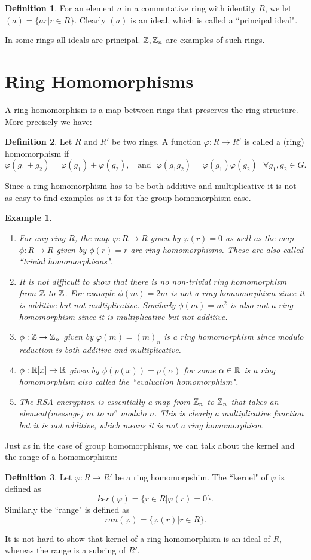 \documentclass[12pt]{article}
\theoremstyle{plain}
\newtheorem{example}{Example}
\theoremstyle{definition}
\newtheorem{definition}{Definition}
\theoremstyle{remark}
\begin{document}
\begin{definition}
For an element $a$ in a commutative ring with identity $R$, we let
$(a) = \{ar|r\in R\}$. Clearly $(a)$ is an ideal, which is called a ``principal ideal".
\end{definition}
In some rings all ideals are principal. $\mathbb{Z}, \mathbb{Z}_n$ are examples of such rings.
\section{Ring Homomorphisms}
A ring homomorphism is a map between rings that preserves the ring structure. More precisely we have:
\begin{definition}
Let $R$ and $R'$ be two rings. A function $\varphi:R\rightarrow R'$ is called a (ring) homomorphism if
$$\varphi(g_1+g_2) = \varphi(g_1)+\varphi(g_2), \:\:\:\:\textrm{and}\:\:\: \varphi(g_1g_2) = \varphi(g_1)\varphi(g_2) \:\:\: \forall g_1, g_2 \in G.$$
\end{definition}
Since a ring homomorphism has to be both additive and multiplicative it is not as easy to find examples as it is for the group homomorphism case.
\begin{example}
\begin{enumerate}
    \item For any ring $R$, the map $\varphi:R \rightarrow R$ given by $\varphi(r)=0$ as well as the map $\phi:R \rightarrow R$ given by $\phi(r)=r$ are ring homomorphisms. These are also called ``trivial homomorphisms".
    \item It is not difficult to show that there is no non-trivial ring homomorphism from $\mathbb{Z}$ to $\mathbb{Z}$. For example $\phi(m)=2m$ is not a ring homomorphism since it is additive but not multiplicative. Similarly $\phi(m)=m^2$ is also not a ring homomorphism since it is multiplicative but not additive.
    \item $\phi:\mathbb{Z} \rightarrow \mathbb{Z}_n$ given by $\varphi(m)=(m)_n$ is a ring homomorphism since modulo reduction is both additive and multiplicative.
    \item $\phi:\mathbb{R}[x]\rightarrow \mathbb{R}$ given by $\phi(p(x)) = p(\alpha)$ for some $\alpha \in \mathbb{R}$ is a ring homomorphism also called the ``evaluation homomorphism".
   \item The RSA encryption is essentially a map from $\mathbb{Z}_n$ to $\mathbb{Z}_n$ that takes an element(message) $m$ to $m^e$ modulo $n$. This is clearly a multiplicative function but it is not additive, which means it is not a ring homomorphism.
\end{enumerate}
\end{example}
Just as in the case of group homomorphisms, we can talk about the kernel and the range of a homomorphism:
\begin{definition}
Let $\varphi:R\rightarrow R'$ be a ring homomorpshim. The ``kernel" of $\varphi$ is defined as
$$ker(\varphi) = \{r\in R|\varphi(r)=0\}.$$
Similarly the ``range" is defined as
$$ran(\varphi) = \{\varphi(r)|r\in R\}.$$
\end{definition}
It is not hard to show that kernel of a ring homomorphism is an ideal of $R$, whereas the range is a subring of $R'$.
\end{document}
